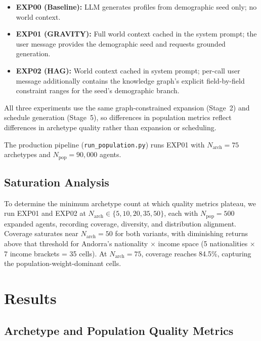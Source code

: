 \documentclass[a4paper,12pt]{article}
\begin{document}
\begin{itemize}
\item \textbf{EXP00 (Baseline):} LLM generates profiles from demographic seed
      only; no world context.
\item \textbf{EXP01 (GRAVITY):} Full world context cached in the system
      prompt; the user message provides the demographic seed and requests
      grounded generation.
\item \textbf{EXP02 (HAG):} World context cached in system prompt; per-call
      user message additionally contains the knowledge graph's explicit
      field-by-field constraint ranges for the seed's demographic branch.
\end{itemize}

All three experiments use the same graph-constrained expansion (Stage~2)
and schedule generation (Stage~5), so differences in population metrics
reflect differences in archetype quality rather than expansion or scheduling.

The production pipeline (\texttt{run\_population.py}) runs EXP01 with
$N_\text{arch} = 75$ archetypes and $N_\text{pop} = 90{,}000$ agents.

\subsection{Saturation Analysis}
\label{subsec:saturation}

To determine the minimum archetype count at which quality metrics plateau,
we run EXP01 and EXP02 at $N_\text{arch} \in \{5, 10, 20, 35, 50\}$,
each with $N_\text{pop} = 500$ expanded agents, recording coverage, diversity,
and distribution alignment. Coverage saturates near $N_\text{arch} = 50$
for both variants, with diminishing returns above that threshold for
Andorra's nationality $\times$ income space (5 nationalities
$\times$ 7 income brackets = 35 cells). At $N_\text{arch} = 75$, coverage
reaches 84.5\%, capturing the population-weight-dominant cells.

\section{Results}
\label{sec:results}

\subsection{Archetype and Population Quality Metrics}
\label{subsec:metrics_results}
\end{document}
